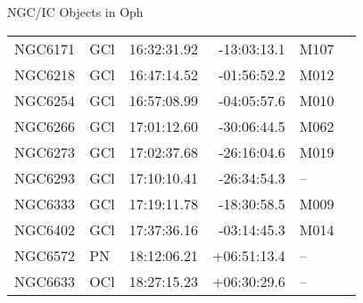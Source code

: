 \begin{block}{NGC/IC Objects in Oph}
  \centering
  \begin{tabularx}{\textwidth}{llrrll} \toprule 
    NGC6171 & GCl & 16:32:31.92 & -13:03:13.1  & M107 \\ 
    NGC6218 & GCl & 16:47:14.52 & -01:56:52.2  & M012 \\ 
    NGC6254 & GCl & 16:57:08.99 & -04:05:57.6  & M010 \\ 
    NGC6266 & GCl & 17:01:12.60 & -30:06:44.5  & M062 \\ 
    NGC6273 & GCl & 17:02:37.68 & -26:16:04.6  & M019 \\ 
    NGC6293 & GCl & 17:10:10.41 & -26:34:54.3  & -- \\ 
    NGC6333 & GCl & 17:19:11.78 & -18:30:58.5  & M009 \\ 
    NGC6402 & GCl & 17:37:36.16 & -03:14:45.3  & M014 \\ 
    NGC6572 & PN & 18:12:06.21 & +06:51:13.4  & -- \\ 
    NGC6633 & OCl & 18:27:15.23 & +06:30:29.6  & -- \\ 
  \end{tabularx}
\end{block}